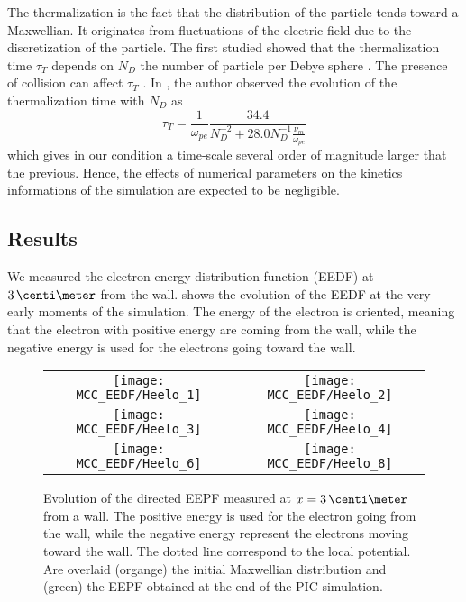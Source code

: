 The thermalization is the fact that the distribution of the particle tends toward a Maxwellian.
It originates from fluctuations of the electric field due to the discretization of the particle.
The first studied showed that the thermalization time $\tau_T$ depends on $N_D$ the number of particle per Debye sphere \citep{dawson1964,montgomery1970}.
The presence of collision can affect $\tau_T$  \citep{turner2006,lai2014}.
In \citet{turner2006}, the author observed the evolution of the thermalization time with $N_D$ as
\begin{equation} \label{eq-taut}
  \tau_T = \frac{1}{\omega_{pe}} \frac{34.4}{N_D^{-2} + 28.0 N_D^{-1} \frac{\nu_m}{\omega_{pe}}}
\end{equation}
which gives in our condition a time-scale several order of magnitude larger that the previous.
Hence, the effects of numerical parameters on the kinetics informations of the simulation are expected to be negligible.


\subsection{Results} \label{subsec-MCMresults}

We measured the electron energy distribution function (EEDF) at $3\,\centi\meter$ from the wall.
 shows the evolution of the EEDF at the very early moments of the simulation.
The energy of the electron is oriented, meaning that the electron with positive energy are coming from the wall, while the negative energy is used for the electrons going toward the wall.

\begin{figure}
  \centering
  \begin{tabular}{cc}
    \texttt{[image: MCC\_EEDF/Heelo\_1]} &
    \texttt{[image: MCC\_EEDF/Heelo\_2]} \\
    \texttt{[image: MCC\_EEDF/Heelo\_3]} &
    \texttt{[image: MCC\_EEDF/Heelo\_4]} \\
    \texttt{[image: MCC\_EEDF/Heelo\_6]} &
    \texttt{[image: MCC\_EEDF/Heelo\_8]} \\
  \end{tabular}
  \caption{Evolution of the directed EEPF measured at $x=3\,\centi\meter$ from a wall. The positive energy is used for the electron going from the wall, while the negative energy represent the electrons moving toward the wall. The dotted line correspond to the local potential. Are overlaid (organge) the initial Maxwellian distribution and (green) the EEPF obtained at the end of the \ac{PIC} simulation. }
  \label{fig-zoom_init_Mc}
\end{figure}


